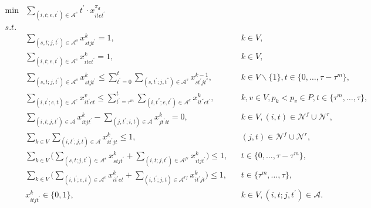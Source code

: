 \documentclass[12pt]{article}
\begin{document}
\begin{subequations}
    \label{M1}
    \begin{flalign}
    \label{m1-obj1}\min& \sum_{(i,t;e,t^{\prime})\in \mathcal{A}^{e}}{t^{\prime}\cdot x^{\pi_d}_{itet^{\prime}}} \\
    s.t.&\quad \nonumber \\
    \label{app-m1-con1}& \sum_{(s,t;j,t^{'})\in \mathcal{A}^{s}}{x^{k}_{stjt^{'}}}=1, &&k\in V, \\
    \label{app-m1-con2}& \sum_{(i,t;e,t^{\prime})\in \mathcal{A}^{e}}{x^k_{itet^{\prime}}}=1, &&k\in V, \\
    \label{app-m1-con3}&\sum_{(s,t;j,t^{'})\in \mathcal{A}^{s}}{x^{k}_{stjt^{'}}}\leqslant \sum_{t^{'}=0}^{t}{\sum_{(s,t^{'};j,t^{''})\in \mathcal{A}^{s}}{x^{k-1}_{st^{'}jt^{''}}}}, &&k\in V\backslash \{1\}, t\in \{0,\dots,\tau-\tau^m\}, \\
    \label{app-m1-con4}& \sum_{(i,t^{\prime};e,t)\in \mathcal{A}^{e}}{x^v_{it^{\prime}et}}\leqslant \sum_{t^{\prime}=\tau^m}^{t}{\sum_{(i,t^{''};e,t^{\prime})\in \mathcal{A}^{e}}{x^k_{it^{''}et^{'}}}}, &&k,v\in V, p_k<p_v\in P, t\in \{\tau^m,\dots,\tau\}, \\
    \label{app-m1-con5}& \sum_{(i,t;j,t^{\prime})\in \mathcal{A}}{x^{k}_{itjt^{\prime}}}-\sum_{(j,t^{\prime};i,t)\in \mathcal{A}}{x^{k}_{jt^{\prime}it}}=0, &&k\in V, (i,t)\in \mathcal{N}^{f}\cup \mathcal{N}^{r}, \\
    \label{app-m1-con6}&\sum_{k\in V}{\sum_{(i,t^{\prime};j,t)\in \mathcal{A}}{x^k_{it^{\prime}jt}}}\leqslant 1, &&(j,t)\in \mathcal{N}^{f}\cup \mathcal{N}^{r}, \\
    \label{app-m1-con7}&\sum_{k\in V}{\big(
    \sum_{(s,t;j,t^{\prime})\in \mathcal{A}^{s}}{x^k_{stjt^{\prime}}}+\sum_{(i,t;j,t^{\prime})\in \mathcal{A}^{fr}}{x^k_{itjt^{\prime}}}\big)} \leqslant 1, &&t\in \{0,\dots,\tau-\tau^{m}\}, \\
    \label{app-m1-con8}&\sum_{k\in V}{\big(\sum_{(i,t^{\prime};e,t)\in \mathcal{A}^{e}}{x^k_{it^{\prime}et}}+\sum_{(i,t^{\prime};j,t)\in \mathcal{A}^{rf}}{x^k_{it^{\prime}jt}} \big)}\leqslant 1, &&t\in \{\tau^m,\dots,\tau\}, \\
    \label{app-m1-con9}&x^{k}_{itjt^{\prime}}\in \{0,1\}, &&k\in V, (i,t;j,t^{\prime})\in \mathcal{A}.
    \end{flalign}
\end{subequations}
\end{document}
